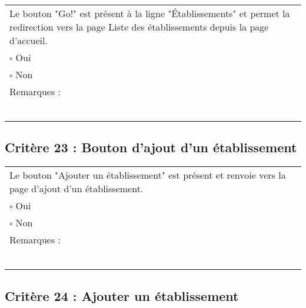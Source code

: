 	\begin{center}
    	 		\begin{tabular}[h]{|p{}|}
			\hline
				Le bouton "Go!" est présent à la ligne "Établissements" et permet la redirection vers la page Liste des établissements depuis la page d'accueil. \\
				$\square$ Oui  \\ $\square$ Non \\\hline Remarques : \\ ~\\
			 \\\hline
     		\end{tabular}
  		\end{center}	
  		
  		
  	\subsection*{Critère 23 : Bouton d'ajout d'un établissement}
	
	\begin{center}
    	 		\begin{tabular}[h]{|p{}|}
			\hline
				Le bouton "Ajouter un établissement" est présent et renvoie vers la page d'ajout d'un établissement. \\
				$\square$ Oui  \\ $\square$ Non \\\hline Remarques : \\ ~\\
			 \\\hline
     		\end{tabular}
  		\end{center}	
  		
  		
  	\subsection*{Critère 24 : Ajouter un établissement}
	
